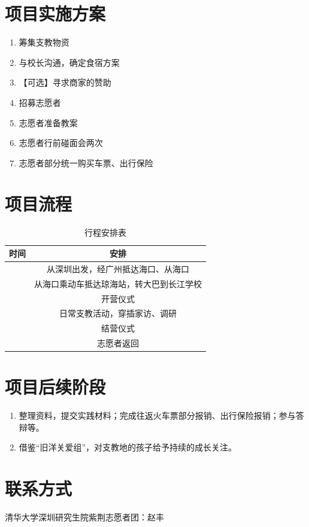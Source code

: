 \documentclass[12pt]{ctexart}
\begin{document}
\section{项目实施方案}
\begin{enumerate}
\item 筹集支教物资
\item 与校长沟通，确定食宿方案
\item 【可选】寻求商家的赞助
\item 招募志愿者
\item 志愿者准备教案
\item 志愿者行前碰面会两次
\item 志愿者部分统一购买车票、出行保险
\end{enumerate}


\section{项目流程}
\begin{table}[!ht]
\centering
\begin{tabular}{|c|c|}
\hline
时间 & 安排 \\
\hline
 &  从深圳出发，经广州抵达海口、从海口 \\
\hline
 & 从海口乘动车抵达琼海站，转大巴到长江学校\\
\hline
 & 开营仪式\\
\hline
 & 日常支教活动，穿插家访、调研 \\
\hline
 & 结营仪式 \\
\hline
 & 志愿者返回 \\
\hline
\end{tabular}
\caption{行程安排表}\label{route}
\end{table}



\section{项目后续阶段}
\begin{enumerate}
\item 整理资料，提交实践材料；完成往返火车票部分报销、出行保险报销；参与答辩等。
\item 借鉴“旧洋关爱组”，对支教地的孩子给予持续的成长关注。
\end{enumerate}
\section{联系方式}
清华大学深圳研究生院紫荆志愿者团：赵丰
\end{document}
